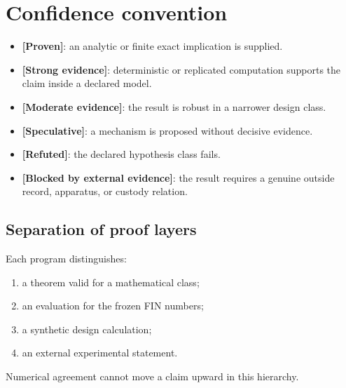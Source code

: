 \documentclass[11pt,a4paper,openany]{report}
\newcommand{\statusProven}{\textcolor{fingreen}{[Proven]}}
\newcommand{\statusStrong}{\textcolor{finblue}{[Strong evidence]}}
\newcommand{\statusModerate}{\textcolor{finviolet}{[Moderate evidence]}}
\newcommand{\statusSpeculative}{\textcolor{finorange}{[Speculative]}}
\newcommand{\statusRefuted}{\textcolor{finred}{[Refuted]}}
\begin{document}
\tableofcontents
\clearpage
{}

\chapter*{Confidence convention}

\begin{itemize}
\item 
\textbf{\statusProven{}}: an analytic or finite exact implication is supplied.

\item 
\textbf{\statusStrong{}}: deterministic or replicated computation supports the claim inside a declared model.

\item 
\textbf{\statusModerate{}}: the result is robust in a narrower design class.

\item 
\textbf{\statusSpeculative{}}: a mechanism is proposed without decisive evidence.

\item 
\textbf{\statusRefuted{}}: the declared hypothesis class fails.

\item 
\textbf{[Blocked by external evidence]}: the result requires a genuine outside record, apparatus, or custody relation.

\end{itemize}

\section{Separation of proof layers}

Each program distinguishes:

\begin{enumerate}
\item 
a theorem valid for a mathematical class;

\item 
an evaluation for the frozen FIN numbers;

\item 
a synthetic design calculation;

\item 
an external experimental statement.

\end{enumerate}

Numerical agreement cannot move a claim upward in this hierarchy.
\end{document}
